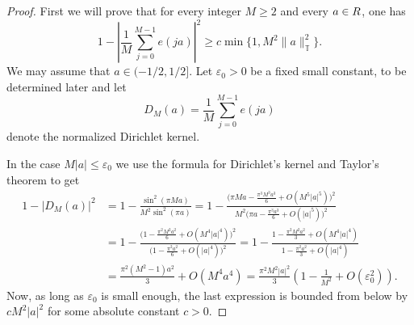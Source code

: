 \documentclass[10pt,a4paper]{amsart}
\newcommand{\R}{\mathbb R}
\newcommand{\T}{\mathbb T}
\begin{document}
\begin{proof}
First we will prove that for every integer $M\geq2$ and every $a\in\mathbb \R$, one has
\begin{equation}\label{eq:euclidean-linear-phase}
 1-\left|\frac1M\sum_{j=0}^{M-1}e(ja)\right|^2
 \geq c\min\{1,M^2\|a\|_{\T}^2\}.
\end{equation}
We may assume that $a \in (-1/2, 1/2]$. Let $\varepsilon_0>0$ be a fixed small constant, to be determined later and let 
\begin{equation*}
    D_M(a)= \frac{1}{M} \sum_{j=0}^{M-1} e(ja)
\end{equation*}
denote the normalized Dirichlet kernel. 

In the case $M|a| \le \varepsilon_0$ we use the formula for Dirichlet's kernel and Taylor's theorem to get 
\begin{align*}
1-\left|D_M(a)\right|^2
&=1-\frac{\sin^2(\pi Ma)}{M^2\sin^2(\pi a)}=1-
\frac{\Big(\pi Ma-\frac{\pi^3M^3a^3}{6}
+O(M^5|a|^5)\Big)^2}
{M^2\Big(\pi a-\frac{\pi^3a^3}{6}
+O(|a|^5)\Big)^2}\\
&=1-
\frac{\Big(1-\frac{\pi^2M^2a^2}{6}
+O(M^4|a|^4)\Big)^2}
{\Big(1-\frac{\pi^2a^2}{6}
+O(|a|^4)\Big)^2}=1-
\frac{1-\frac{\pi^2M^2a^2}{3}
+O(M^4|a|^4)}
{1-\frac{\pi^2a^2}{3}
+O(|a|^4)}\\
&=\frac{\pi^2(M^2-1)a^2}{3}
+O(M^4a^4)=\frac{\pi^2M^2|a|^2}{3}
\left(1-\frac{1}{M^2}+O(\varepsilon_0^2)\right).
\end{align*}
Now, as long as $\varepsilon_0$ is small enough, the last expression is bounded from below by $cM^2|a|^2$ for some absolute constant $c>0$.


\end{proof}
\end{document}
